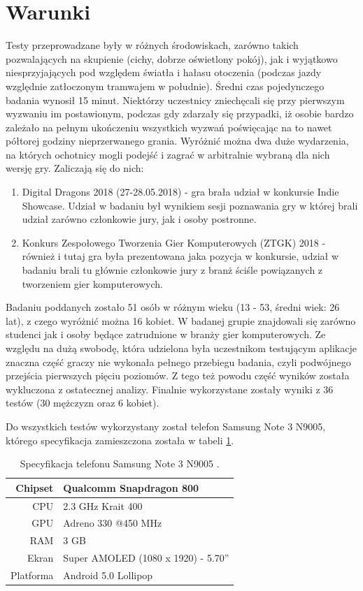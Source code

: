 \documentclass[a4paper,12pt,numbers=noenddot]{report}
\begin{document}
\section{Warunki}
Testy przeprowadzane były w różnych środowiskach, zarówno takich pozwalających na skupienie (cichy, dobrze oświetlony pokój), jak i wyjątkowo niesprzyjających pod względem światła i hałasu otoczenia (podczas jazdy względnie zatłoczonym tramwajem w południe). Średni czas pojedynczego badania wynosił 15 minut. Niektórzy uczestnicy zniechęcali się przy pierwszym wyzwaniu im postawionym, podczas gdy zdarzały się przypadki, iż osobie bardzo zależało na pełnym ukończeniu wszystkich wyzwań poświęcając na to nawet półtorej godziny nieprzerwanego grania. Wyróżnić można dwa duże wydarzenia, na których ochotnicy mogli podejść i zagrać w arbitralnie wybraną dla nich wersję gry. Zaliczają się do nich:
\begin{enumerate}
\item Digital Dragons 2018 (27-28.05.2018) - gra brała udział w konkursie Indie Showcase. Udział w badaniu był wynikiem sesji poznawania gry w której brali udział zarówno członkowie jury, jak i osoby postronne.
\item Konkurs Zespołowego Tworzenia Gier Komputerowych (ZTGK) 2018 - również i tutaj gra była prezentowana jaka pozycja w konkursie, udział w badaniu brali tu głównie członkowie jury z branż ściśle powiązanych z tworzeniem gier komputerowych.
\end{enumerate}
Badaniu poddanych zostało 51 osób w różnym wieku (13 - 53, średni wiek: 26 lat), z czego wyróżnić można 16 kobiet. W badanej grupie znajdowali się zarówno studenci jak i osoby będące zatrudnione w branży gier komputerowych. Ze względu na dużą swobodę, która udzielona była uczestnikom testującym aplikacje znaczna część graczy nie wykonała pełnego przebiegu badania, czyli podwójnego przejścia pierwszych pięciu poziomów. Z tego też powodu część wyników została wykluczona z ostatecznej analizy. Finalnie wykorzystane zostały wyniki z 36 testów (30 mężczyzn oraz 6 kobiet).

Do wszystkich testów wykorzystany został telefon Samsung Note 3 N9005, którego specyfikacja zamieszczona została w tabeli \ref{tab:tab_telSpec}.

\begin{table}[H]
  \centering
  \caption{Specyfikacja telefonu Samsung Note 3 N9005 \cite{online_Note3Spec}.}
  \label{tab:tab_telSpec}
  \begin{tabular}{|r|l|}
    \hline
    Chipset & Qualcomm Snapdragon 800 \\
    \hline
    CPU & 2.3 GHz Krait 400\\
    \hline
    GPU & Adreno 330 @450 MHz\\
    \hline
    RAM & 3 GB\\
    \hline
    Ekran & Super AMOLED (1080 x 1920) - 5.70''\\
    \hline
    Platforma & Android 5.0 Lollipop\\
    \hline
  \end{tabular}
\end{table}
\end{document}
